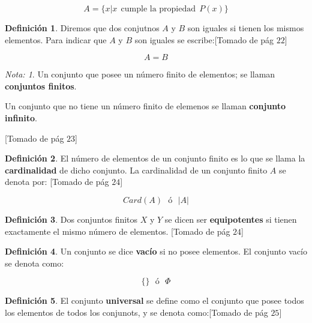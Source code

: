 \documentclass[]{book}
\theoremstyle{definition}
\newtheorem{definition}{Definición}[chapter]
\theoremstyle{definition}
\theoremstyle{definition}
\theoremstyle{remark}
\newtheorem*{remark}{Nota: }
\begin{document}
\[
A=\{ x | x \ \ \text{cumple la propiedad} \ \ P(x)   \}
\]

\begin{definition}
\protect\hypertarget{def:unnamed-chunk-4}{}{\label{def:unnamed-chunk-4} }Diremos que dos conjutnos \(A\) y \(B\) son iguales si tienen los mismos elementos. Para indicar que \(A\) y \(B\) son iguales se escribe:{[}Tomado de \citep{zill2012algebra} pág \(22\){]}
\end{definition}

\[
A=B
\]

\begin{remark}
\iffalse{} {Nota: } \fi{}Un conjunto que posee un número finito de elementos; se llaman \textbf{conjuntos finitos}.

Un conjunto que no tiene un número finito de elemenos se llaman \textbf{conjunto infinito}.

{[}Tomado de \citep{zill2012algebra} pág \(23\){]}
\end{remark}

\begin{definition}
\protect\hypertarget{def:unnamed-chunk-6}{}{\label{def:unnamed-chunk-6} }El número de elementos de un conjunto finito es lo que se llama la \textbf{cardinalidad} de dicho conjunto. La cardinalidad de un conjunto finito \(A\) se denota por: {[}Tomado de \citep{zill2012algebra} pág \(24\){]}
\end{definition}

\[
Card(A) \ \ \ \text{ó}  \ \ \ |A|
\]

\begin{definition}
\protect\hypertarget{def:unnamed-chunk-7}{}{\label{def:unnamed-chunk-7} }Dos conjuntos finitos \(X\) y \(Y\) se dicen ser \textbf{equipotentes} si tienen exactamente el mismo número de elementos. {[}Tomado de \citep{zill2012algebra} pág \(24\){]}
\end{definition}

\begin{definition}
\protect\hypertarget{def:unnamed-chunk-8}{}{\label{def:unnamed-chunk-8} }Un conjunto se dice \textbf{vacío} si no posee elementos. El conjunto vacío se denota como:
\end{definition}

\[
\{ \} \ \ \ \text{ó}  \ \ \ \Phi
\]

\begin{definition}
\protect\hypertarget{def:unnamed-chunk-9}{}{\label{def:unnamed-chunk-9} }El conjunto \textbf{universal} se define como el conjunto que posee todos los elementos de todos los conjunots, y se denota como:{[}Tomado de \citep{zill2012algebra} pág \(25\){]}
\end{definition}
\end{document}
